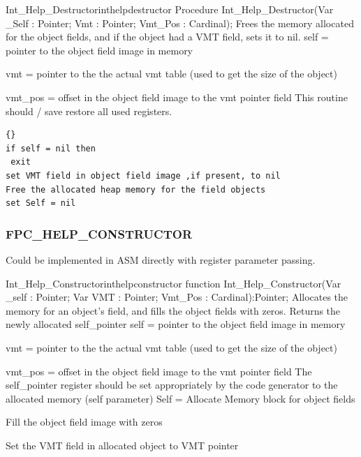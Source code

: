 \documentclass [12pt]{article}
\begin{document}
\begin{procedurel}{Int{\_}Help{\_}Destructor}{inthelpdestructor}
\Declaration
Procedure Int{\_}Help{\_}Destructor(Var {\_}Self : Pointer; Vmt : Pointer; Vmt{\_}Pos : Cardinal);
\Description 
Frees the memory allocated for the object fields, and if the object had a
VMT field, sets it to nil.
\Parameters 
self = pointer to the object field image in memory \par
vmt = pointer to the the actual vmt table (used to get the size of the object) \par
vmt{\_}pos = offset in the object field image to the vmt pointer field 
\Notes 
This routine should / save restore all used registers. 
\Algorithm 
\begin{lstlisting}{}
if self = nil then 
 exit
set VMT field in object field image ,if present, to nil
Free the allocated heap memory for the field objects
set Self = nil
\end{lstlisting}
\end{procedurel}

\subsubsection{FPC{\_}HELP{\_}CONSTRUCTOR}
\label{subsubsec:mylabel83}

Could be implemented in ASM directly with register parameter passing.

\begin{functionl}{Int{\_}Help{\_}Constructor}{inthelpconstructor}
\Declaration
function Int{\_}Help{\_}Constructor(Var {\_}self : Pointer; Var VMT : Pointer; Vmt{\_}Pos : Cardinal):Pointer;
\Description 
Allocates the memory for an object's field, and fills the object fields with
zeros. Returns the newly allocated self{\_}pointer
\Parameters 
self = pointer to the object field image in memory \par 
vmt = pointer to the the actual vmt table (used to get the size of the object) \par 
vmt{\_}pos = offset in the object field image to the vmt pointer field
\Notes 
The self{\_}pointer register should be set appropriately by the code
generator to the allocated memory (self parameter)
\Algorithm 
Self = Allocate Memory block for object fields \par
Fill the object field image with zeros\par
Set the VMT field in allocated object to VMT pointer
\end{functionl}
\end{document}
